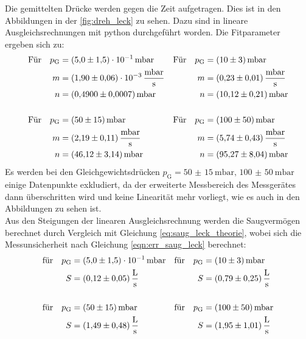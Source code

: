     \noindent Die gemittelten Drücke werden gegen die Zeit aufgetragen. Dies ist in den Abbildungen in der \autoref{fig:dreh_leck} zu sehen. Dazu sind in lineare Ausgleichsrechnungen 
    mit python \cite{scipy} durchgeführt worden. Die Fitparameter ergeben sich zu:
    \begin{align*}
      \text{Für} \quad  p_\text{G} &= \SI{5.0(15)e-1}{\milli\bar}  & \text{Für} \quad  p_\text{G} &= \SI{10(3)}{\milli\bar}\\
      m &= \SI{1.90(6)e-3}{\milli\bar\per\second}           & m &= \SI{0.23 \pm 0.01}{\milli\bar\per\second} \\
      n &= \SI{0.49 \pm 0.0007}{\milli\bar}                 & n &= \SI{10.12 \pm 0.21}{\milli\bar} \\
      \\
      \text{Für} \quad  p_\text{G} &= \SI{50(15)}{\milli\bar}   & \text{Für} \quad  p_\text{G} &= \SI{100(50)}{\milli\bar}\\
      m &= \SI{2.19 \pm 0.11}{\milli\bar\per\second}        & m &= \SI{5.74 \pm 0.43}{\milli\bar\per\second} \\
      n &= \SI{46.12 \pm 3.14}{\milli\bar}                  & n &= \SI{95.27 \pm 8.04}{\milli\bar} 
    \end{align*}
    Es werden bei den Gleichgewichtsdrücken $p_\text{G} = \SI{50(15)}{\milli\bar}, \, \SI{100(50)}{\milli\bar}$ einige Datenpunkte exkludiert, da der erweiterte Messbereich des Messgerätes
    dann überschritten wird und keine Linearität mehr vorliegt, wie es auch in den Abbildungen zu sehen ist. \\
    Aus den Steigungen der linearen Ausgleichsrechnung werden die Saugvermögen berechnet durch Vergleich mit Gleichung \eqref{eq:saug_leck_theorie}, wobei sich die Messunsicherheit nach Gleichung \eqref{eqn:err_saug_leck} berechnet:
    \begin{align*}
      \text{für} \quad p_\text{G} &= \SI{5.0(15)e-1}{\milli\bar} & \text{für} \quad p_\text{G} &= \SI{10(3)}{\milli\bar} \\
      S &= \SI{0.12 \pm 0.05}{\litre\per\second}               & S &= \SI{0.79 \pm 0.25}{\litre\per\second}  \\
      \\
      \text{für} \quad p_\text{G} &= \SI{50(15)}{\milli\bar}  & \text{für} \quad p_\text{G} &= \SI{100(50)}{\milli\bar} \\
      S &= \SI{1.49 \pm 0.48}{\litre\per\second}               & S &= \SI{1.95 \pm 1.01}{\litre\per\second}  
    \end{align*}

